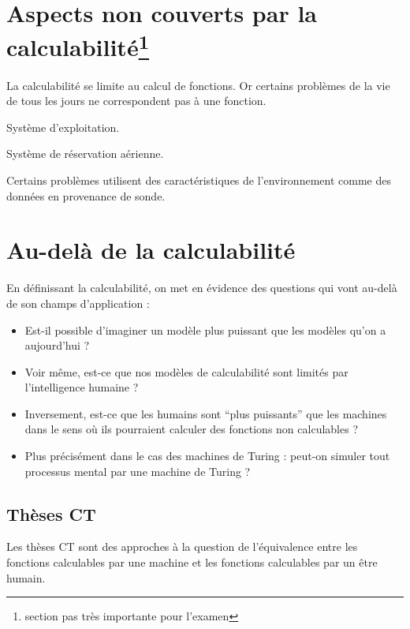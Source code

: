 \begin{description}
\section{Aspects non couverts par la calculabilité\protect\footnote{section pas très importante pour l'examen}}
\label{sub:aspects_non_couvert_par_la_calculabilit_}
La calculabilité se limite au calcul de fonctions. Or certains problèmes de la vie de tous les jours ne correspondent pas à une fonction.

\begin{myexem}
Système d'exploitation.
\end{myexem}

\begin{myexem}
Système de réservation aérienne.
\end{myexem}

\begin{myexem}
Certains problèmes utilisent des caractéristiques de l'environnement comme des données en provenance de sonde.
\end{myexem}

\section{Au-delà de la calculabilité}
\label{sub:au_del_de_la_calculabilit_}
En définissant la calculabilité, on met en évidence des questions qui vont au-delà de son champs d'application :
\begin{itemize}
	\item Est-il possible d'imaginer un modèle plus puissant que les modèles qu'on a aujourd'hui ?
	\item Voir même, est-ce que nos modèles de calculabilité sont limités par l'intelligence humaine ?
	\item Inversement, est-ce que les humains sont ``plus puissants'' que les machines dans le sens où ils pourraient calculer des fonctions non calculables ?
	\item Plus précisément dans le cas des machines de Turing : peut-on simuler tout processus mental par une machine de Turing ?
\end{itemize}
 

\subsection{Thèses CT}
Les thèses CT sont des approches à la question de l'équivalence entre les fonctions calculables par une machine et les fonctions calculables par un être humain.


\end{description}
